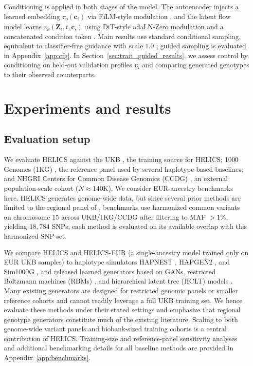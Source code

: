 \documentclass{article}
\begin{document}
Conditioning is applied in both stages of the model. The autoencoder injects a learned embedding \(\tau_\eta(\boldsymbol{c}_i)\) via FiLM-style modulation \cite{perez2018film}, and the latent flow model learns \(v_\theta(\boldsymbol{Z}_t,t,\boldsymbol{c}_i)\) using DiT-style adaLN-Zero modulation and a concatenated condition token \cite{peebles2023scalable}. Main results use standard conditional sampling, equivalent to classifier-free guidance with scale \(1.0\) \cite{ho2022classifier}; guided sampling is evaluated in Appendix~\ref{app:cfg}. In Section~\ref{sec:trait_guided_results}, we assess control by conditioning on held-out validation profiles \(\boldsymbol{c}_i\) and comparing generated genotypes to their observed counterparts.


\section{Experiments and results}


\subsection{Evaluation setup}
\label{sec:evals}

We evaluate HELICS against the UKB \cite{bycroft2018uk}, the training source for HELICS; 1000 Genomes (1KG) \cite{auton2015global}, the reference panel used by several haplotype-based baselines; and NHGRI Centers for Common Disease Genomics (CCDG) \cite{regier2018functional}, an external population-scale cohort (\(N\approx 140\mathrm{K}\)). We consider EUR-ancestry benchmarks here. HELICS generates genome-wide data, but since several prior methods are limited to the regional panel of \cite{yelmenGAN}, benchmarks use harmonized common variants on chromosome 15 across UKB/1KG/CCDG after filtering to MAF \(>1\%\), yielding \(18{,}784\) SNPs; each method is evaluated on its available overlap with this harmonized SNP set. 


We compare HELICS and HELICS-EUR (a single-ancestry model trained only on EUR UKB samples) to haplotype simulators HAPNEST \cite{wharrie2023hapnest}, HAPGEN2 \cite{su2011hapgen2}, and Sim1000G \cite{dimitromanolakis2019sim1000g}, and released learned generators based on GANs, restricted Boltzmann machines (RBMs) \cite{yelmenGAN}, and hierarchical latent tree (HCLT) models \cite{dang2023HCLTs}. Many existing generators are designed for restricted genomic panels or smaller reference cohorts and cannot readily leverage a full UKB training set. We hence evaluate these methods under their stated settings and emphasize that regional genotype generators constitute much of the existing literature. Scaling to both genome-wide variant panels and biobank-sized training cohorts is a central contribution of HELICS. Training-size and reference-panel sensitivity analyses and additional benchmarking details for all baseline methods are provided in Appendix~\ref{app:benchmarks}.
\end{document}
